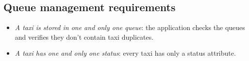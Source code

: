 \subsection{Queue management requirements}
\begin{itemize}
\item \textit{A taxi is stored in one and only one queue}: the application checks the queues and verifies they don't contain taxi duplicates.
\item \textit{A taxi has one and only one status}: every taxi has only a status attribute.
\end{itemize}